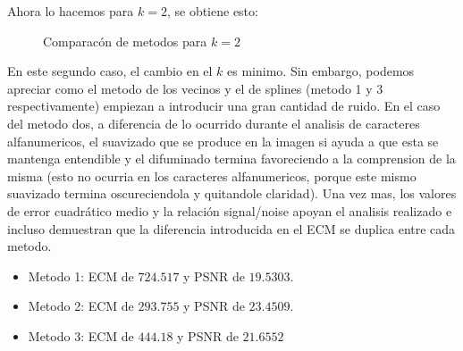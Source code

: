 Ahora lo hacemos para $k=2$, se obtiene esto:

\begin{figure}[H]
    \centering
    \qquad
    \qquad
    \caption{Comparacón de metodos para $k = 2$}
    \label{fig:example}%
\end{figure}

En este segundo caso, el cambio en el $k$ es minimo. Sin embargo, podemos apreciar como el metodo de los vecinos y el de splines (metodo 1 y 3 respectivamente) empiezan a introducir una gran cantidad de ruido. En el caso del metodo dos, a diferencia de lo ocurrido durante el analisis de caracteres alfanumericos, el suavizado que se produce en la imagen si ayuda a que esta se mantenga entendible y el difuminado termina favoreciendo a la comprension de la misma (esto no ocurria en los caracteres alfanumericos, porque este mismo suavizado termina oscureciendola y quitandole claridad).
Una vez mas, los valores de error cuadrático medio y la relación signal/noise apoyan el analisis realizado e incluso demuestran que la diferencia introducida en el ECM se duplica entre cada metodo.
\begin{itemize}
 \item Metodo 1: ECM de $724.517$ y PSNR de $19.5303$.
 \item Metodo 2: ECM de $293.755$ y PSNR de $23.4509$.
 \item Metodo 3: ECM de $444.18$ y PSNR de $21.6552$
\end{itemize}


